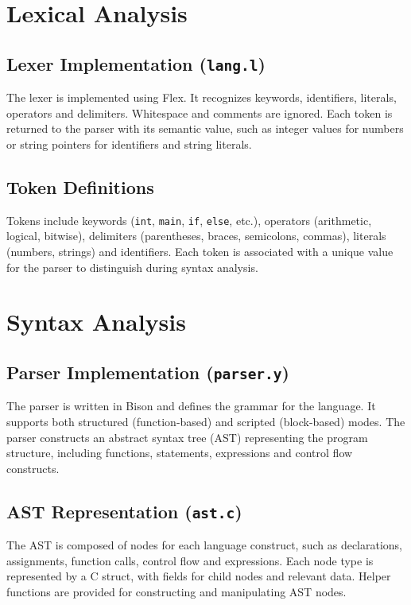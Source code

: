 \documentclass{article}
\begin{document}
\section{Lexical Analysis}
    \subsection{Lexer Implementation (\texttt{lang.l})} 
    The lexer is implemented using Flex. It recognizes keywords, identifiers, literals, operators and delimiters. Whitespace and comments are ignored. Each token is returned to the parser with its semantic value, such as integer values for numbers or string pointers for identifiers and string literals.
    
    \subsection{Token Definitions} 
    Tokens include keywords (\texttt{int}, \texttt{main}, \texttt{if}, \texttt{else}, etc.), operators (arithmetic, logical, bitwise), delimiters (parentheses, braces, semicolons, commas), literals (numbers, strings) and identifiers. Each token is associated with a unique value for the parser to distinguish during syntax analysis.

\section{Syntax Analysis}

    \subsection{Parser Implementation (\texttt{parser.y})} 
    The parser is written in Bison and defines the grammar for the language. It supports both structured (function-based) and scripted (block-based) modes. The parser constructs an abstract syntax tree (AST) representing the program structure, including functions, statements, expressions and control flow constructs.
    
    \subsection{AST Representation (\texttt{ast.c})} 
    The AST is composed of nodes for each language construct, such as declarations, assignments, function calls, control flow and expressions. Each node type is represented by a C struct, with fields for child nodes and relevant data. Helper functions are provided for constructing and manipulating AST nodes.
    
\end{document}
